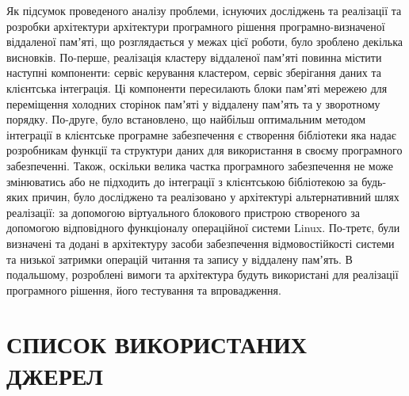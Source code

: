 Як підсумок проведеного аналізу проблеми, існуючих досліджень та реалізації та розробки архітектури архітектури програмного рішення програмно-визначеної віддаленої памʼяті, що розглядається у межах цієї роботи, було зроблено декілька висновків.
По-перше, реалізація кластеру віддаленої памʼяті повинна містити наступні компоненти: сервіс керування кластером, сервіс зберігання даних та клієнтська інтеграція. Ці компоненти пересилають блоки памʼяті мережею для переміщення холодних сторінок памʼяті у віддалену памʼять та у зворотному порядку.
По-друге, було встановлено, що найбільш оптимальним методом інтеграції в клієнтське програмне забезпечення є створення бібліотеки яка надає розробникам функції та структури даних для використання в своєму програмного забезпеченні. Також, оскільки велика частка програмного забезпечення не може змінюватись або не підходить до інтеграції з клієнтською бібліотекою за будь-яких причин, було досліджено та реалізовано у архітектурі альтернативний шлях реалізації: за допомогою віртуального блокового пристрою створеного за допомогою відповідного функціоналу операційної системи Linux.
По-третє, були визначені та додані в архітектуру засоби забезпечення відмовостійкості системи та низької затримки операцій читання та запису у віддалену памʼять.
В подальшому, розроблені вимоги та архітектура будуть використані для реалізації програмного рішення, його тестування та впровадження. 

\chapter {СПИСОК ВИКОРИСТАНИХ ДЖЕРЕЛ}

